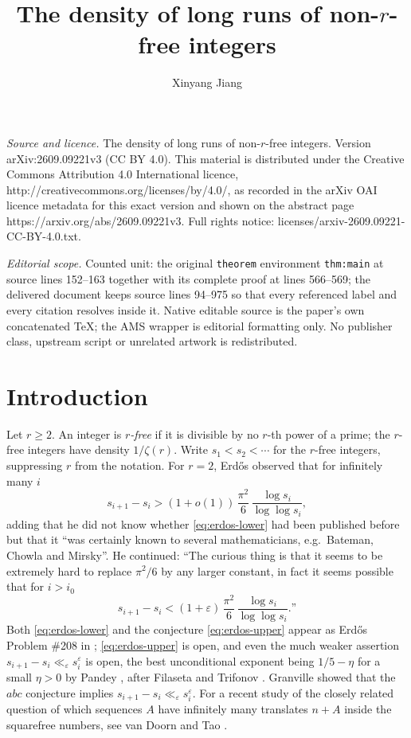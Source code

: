 \documentclass[10pt,a4paper]{amsart}
\numberwithin{equation}{section}
\begin{document}
\title[The density of long runs of non-r-free integers]{The density of long runs of non-$r$-free integers}
\author{Xinyang Jiang}
\date{}
\maketitle
\noindent\emph{Source and licence.} The density of long runs of non-$r$-free integers. Version arXiv:2609.09221v3 (CC BY 4.0). This material is distributed under the Creative Commons Attribution 4.0 International licence, http://creativecommons.org/licenses/by/4.0/, as recorded in the arXiv OAI licence metadata for this exact version and shown on the abstract page https://arxiv.org/abs/2609.09221v3. Full rights notice: licenses/arxiv-2609.09221-CC-BY-4.0.txt.\par\smallskip
\noindent\textit{Editorial scope.} Counted unit: the original \texttt{theorem} environment \texttt{thm:main} at source lines 152--163 together with its complete proof at lines 566--569; the delivered document keeps source lines 94--975 so that every referenced label and every citation resolves inside it. Native editable source is the paper's own concatenated TeX; the AMS wrapper is editorial formatting only. No publisher class, upstream script or unrelated artwork is redistributed.
\section{Introduction}\label{sec:intro}

Let $r\ge2$. An integer is \emph{$r$-free} if it is divisible by no $r$-th power of a
prime; the $r$-free integers have density $1/\zeta(r)$. Write $s_1<s_2<\cdots$ for the
$r$-free integers, suppressing $r$ from the notation. For $r=2$, Erd\H{o}s
\cite[(20)]{Erdos1951} observed that for infinitely many $i$
\begin{equation}\label{eq:erdos-lower}
  s_{i+1}-s_i>(1+o(1))\,\frac{\pi^{2}}{6}\,\frac{\log s_i}{\log\log s_i},
\end{equation}
adding that he did not know whether \eqref{eq:erdos-lower} had been published before but
that it ``was certainly known to several mathematicians, e.g.\ Bateman, Chowla and
Mirsky''. He continued: ``The curious thing is that it seems to be extremely hard to
replace $\pi^{2}/6$ by any larger constant, in fact it seems possible that for $i>i_0$
\begin{equation}\label{eq:erdos-upper}
  s_{i+1}-s_i<(1+\varepsilon)\,\frac{\pi^{2}}{6}\,\frac{\log s_i}{\log\log s_i}.\text{''}
\end{equation}
Both \eqref{eq:erdos-lower} and the conjecture \eqref{eq:erdos-upper} appear as Erd\H{o}s
Problem \#208 in \cite{Bloom}; \eqref{eq:erdos-upper} is open, and even the much weaker
assertion $s_{i+1}-s_i\ll_\varepsilon s_i^{\varepsilon}$ is open, the best unconditional
exponent being $1/5-\eta$ for a small $\eta>0$ by Pandey \cite{Pandey}, after Filaseta and
Trifonov \cite{FT1992}. Granville \cite{Granville} showed that the $abc$ conjecture implies
$s_{i+1}-s_i\ll_\varepsilon s_i^{\varepsilon}$. For a recent study of the closely related
question of which sequences $A$ have infinitely many translates $n+A$ inside the squarefree
numbers, see van Doorn and Tao \cite{VDT}.
\end{document}
